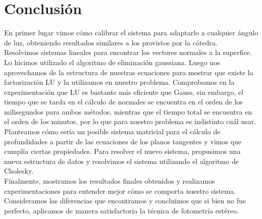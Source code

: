 \section{Conclusión}

En primer lugar vimos cómo calibrar el sistema para adaptarlo a cualquier ángulo de luz, obteniendo resultados similares a los provistos por la cátedra. \\

Resolvimos sistemas lineales para encontrar los vectores normales a la superfice. Lo hicimos utilizado el algoritmo de eliminación gaussiana. Luego nos aprovechamos de la estructura de nuestras ecuaciones para mostrar que existe la factorización LU y la utilizamos en nuestro problema. Comprobamos en la experimentación que LU es bastante más eficiente que Gauss, sin embargo, el tiempo que se tarda en el cálculo de normales se encuentra en el orden de los milisegundos para ambos métodos, mientras que el tiempo total se encuentra en el orden de los minutos, por lo que para nuestro problema es indistinto cuál usar. \\

Planteamos cómo sería un posible sistema matricial para el cálculo de profundidades a partir de las ecuaciones de los planos tangentes y vimos que cumplía ciertas propiedades. Para resolver el nuevo sistema, propusimos una nueva estructura de datos y resolvimos el sistema utilizando el algoritmo de Cholesky. \\

Finalmente, mostramos los resultados finales obtenidos y realizamos experimentaciones para entender mejor cómo se comporta nuestro sistema. Consideramos las diferencias que encontramos y concluimos que si bien no fue perfecto, aplicamos de manera satisfactoria la técnica de fotometría estéreo. \\